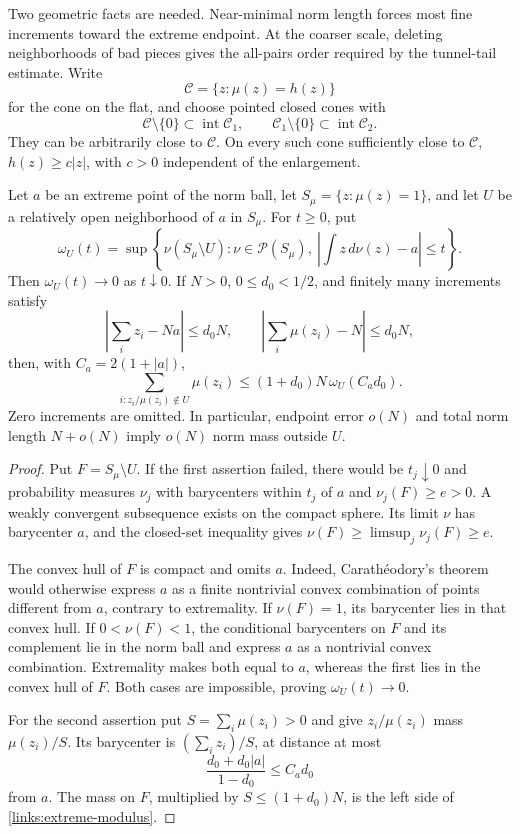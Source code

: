 Two geometric facts are needed. Near-minimal norm length forces most
fine increments toward the extreme endpoint. At the coarser scale,
deleting neighborhoods of bad pieces gives the all-pairs order required
by the tunnel-tail estimate. Write
\[
 \mathcal C=\{z:\mu(z)=h(z)\}
\]
for the cone on the flat, and choose pointed closed cones with
\[
 \mathcal C\setminus\{0\}\subset\operatorname{int}\mathcal C_1,
 \qquad
 \mathcal C_1\setminus\{0\}\subset\operatorname{int}\mathcal C_2.
\]
They can be arbitrarily close to \(\mathcal C\). On every such cone
sufficiently close to \(\mathcal C\), \(h(z)\ge c|z|\), with \(c>0\)
independent of the enlargement.

\begin{lemma}
\label{links:extreme}
Let \(a\) be an extreme point of the norm ball, let
\(S_\mu=\{z:\mu(z)=1\}\), and let \(U\) be a relatively open
neighborhood of \(a\) in \(S_\mu\). For \(t\ge0\), put
\[
 \omega_U(t)=\sup\left\{\nu(S_\mu\setminus U):
    \nu\in\mathcal P(S_\mu),\
    \left|\int z\,d\nu(z)-a\right|\le t\right\}.
\]
Then \(\omega_U(t)\to0\) as \(t\downarrow0\). If \(N>0\),
\(0\le d_0<1/2\), and finitely many increments satisfy
\[
 \left|\sum_i z_i-Na\right|\le d_0N,\qquad
 \left|\sum_i\mu(z_i)-N\right|\le d_0N,
\]
then, with \(C_a=2(1+|a|)\),
\begin{equation}
 \sum_{i:z_i/\mu(z_i)\notin U}\mu(z_i)
 \le (1+d_0)N\,\omega_U(C_a d_0).
 \label{links:extreme-modulus}
\end{equation}
Zero increments are omitted. In particular, endpoint error \(o(N)\)
and total norm length \(N+o(N)\) imply \(o(N)\) norm mass outside \(U\).
\end{lemma}

\begin{proof}
Put \(F=S_\mu\setminus U\). If the first assertion failed, there
would be \(t_j\downarrow0\) and probability measures \(\nu_j\) with
barycenters within \(t_j\) of \(a\) and \(\nu_j(F)\ge e>0\).
A weakly convergent subsequence exists on the compact sphere. Its
limit \(\nu\) has barycenter \(a\), and the closed-set inequality
gives \(\nu(F)\ge\limsup_j\nu_j(F)\ge e\).

The convex hull of \(F\) is compact and omits \(a\). Indeed,
Carath\'eodory's theorem would otherwise express \(a\) as a finite
nontrivial convex combination of points different from \(a\),
contrary to extremality. If \(\nu(F)=1\), its barycenter lies in that
convex hull. If \(0<\nu(F)<1\), the conditional barycenters on \(F\)
and its complement lie in the norm ball and express \(a\) as a
nontrivial convex combination. Extremality makes both equal to \(a\),
whereas the first lies in the convex hull of \(F\). Both cases are
impossible, proving \(\omega_U(t)\to0\).

For the second assertion put \(S=\sum_i\mu(z_i)>0\) and give
\(z_i/\mu(z_i)\) mass \(\mu(z_i)/S\). Its barycenter is
\((\sum_i z_i)/S\), at distance at most
\[
 \frac{d_0+d_0|a|}{1-d_0}\le C_a d_0
\]
from \(a\). The mass on \(F\), multiplied by \(S\le(1+d_0)N\),
is the left side of \eqref{links:extreme-modulus}.
\end{proof}

